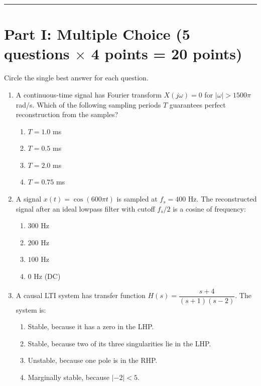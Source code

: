 \documentclass[11pt]{article}
\begin{document}
\hrule
\vspace{10pt}

\section*{Part I: Multiple Choice \hfill (5 questions $\times$ 4 points = 20 points)}

Circle the single best answer for each question.

\begin{enumerate}[leftmargin=*, label=\textbf{\arabic*.}]

\item A continuous-time signal has Fourier transform $X(j\omega)=0$ for $|\omega|>1500\pi$ rad/s. Which of the following sampling periods $T$ guarantees perfect reconstruction from the samples?
\begin{enumerate}[label=(\alph*)]
    \item $T = 1.0$ ms
    \item $T = 0.5$ ms
    \item $T = 2.0$ ms
    \item $T = 0.75$ ms
\end{enumerate}

\item A signal $x(t) = \cos(600\pi t)$ is sampled at $f_s = 400$ Hz. The reconstructed signal after an ideal lowpass filter with cutoff $f_s/2$ is a cosine of frequency:
\begin{enumerate}[label=(\alph*)]
    \item $300$ Hz
    \item $200$ Hz
    \item $100$ Hz
    \item $0$ Hz (DC)
\end{enumerate}

\item A causal LTI system has transfer function $H(s) = \dfrac{s+4}{(s+1)(s-2)}$. The system is:
\begin{enumerate}[label=(\alph*)]
    \item Stable, because it has a zero in the LHP.
    \item Stable, because two of its three singularities lie in the LHP.
    \item Unstable, because one pole is in the RHP.
    \item Marginally stable, because $|{-2}|<5$.
\end{enumerate}


\end{enumerate}
\end{document}
